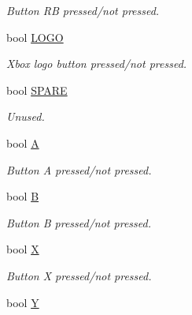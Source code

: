 \begin{DoxyCompactItemize}
\begin{DoxyCompactList}\small\item\em Button R\-B pressed/not pressed. \end{DoxyCompactList}\item 
\hypertarget{structbutton_a756d4aa3f95373a5058cb02a897d12cf}{bool \hyperlink{structbutton_a756d4aa3f95373a5058cb02a897d12cf}{L\-O\-G\-O}}\label{structbutton_a756d4aa3f95373a5058cb02a897d12cf}

\begin{DoxyCompactList}\small\item\em Xbox logo button pressed/not pressed. \end{DoxyCompactList}\item 
\hypertarget{structbutton_aaf3a9df2c4578bd2d3591334e0d9ace5}{bool \hyperlink{structbutton_aaf3a9df2c4578bd2d3591334e0d9ace5}{S\-P\-A\-R\-E}}\label{structbutton_aaf3a9df2c4578bd2d3591334e0d9ace5}

\begin{DoxyCompactList}\small\item\em Unused. \end{DoxyCompactList}\item 
\hypertarget{structbutton_a014568bcfa1204a9c4ca9799c1b47102}{bool \hyperlink{structbutton_a014568bcfa1204a9c4ca9799c1b47102}{A}}\label{structbutton_a014568bcfa1204a9c4ca9799c1b47102}

\begin{DoxyCompactList}\small\item\em Button A pressed/not pressed. \end{DoxyCompactList}\item 
\hypertarget{structbutton_a0152c46354bddcc592bce01be84d9dfd}{bool \hyperlink{structbutton_a0152c46354bddcc592bce01be84d9dfd}{B}}\label{structbutton_a0152c46354bddcc592bce01be84d9dfd}

\begin{DoxyCompactList}\small\item\em Button B pressed/not pressed. \end{DoxyCompactList}\item 
\hypertarget{structbutton_aab1bde286e010d81472b269b419806d6}{bool \hyperlink{structbutton_aab1bde286e010d81472b269b419806d6}{X}}\label{structbutton_aab1bde286e010d81472b269b419806d6}

\begin{DoxyCompactList}\small\item\em Button X pressed/not pressed. \end{DoxyCompactList}\item 
\hypertarget{structbutton_a1d79ec66791bea4323f4f857c48c2975}{bool \hyperlink{structbutton_a1d79ec66791bea4323f4f857c48c2975}{Y}}\label{structbutton_a1d79ec66791bea4323f4f857c48c2975}


\end{DoxyCompactItemize}
